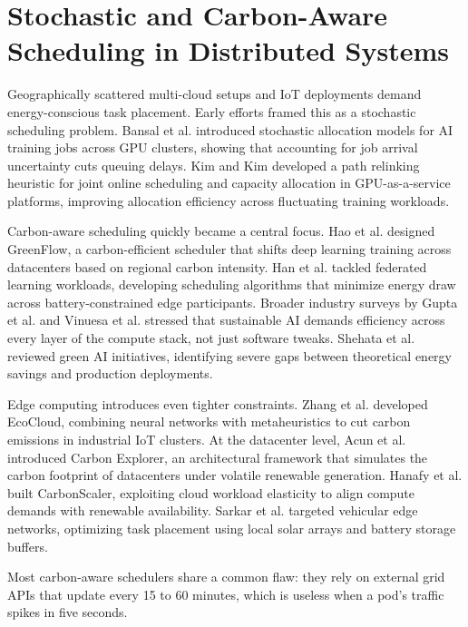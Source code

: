 \documentclass[12pt]{report}
\begin{document}
\section{Stochastic and Carbon-Aware Scheduling in Distributed Systems}

Geographically scattered multi-cloud setups and IoT deployments demand energy-conscious task placement. Early efforts framed this as a stochastic scheduling problem. Bansal et al. \cite{bansal2023} introduced stochastic allocation models for AI training jobs across GPU clusters, showing that accounting for job arrival uncertainty cuts queuing delays. Kim and Kim \cite{kim2023} developed a path relinking heuristic for joint online scheduling and capacity allocation in GPU-as-a-service platforms, improving allocation efficiency across fluctuating training workloads. 

Carbon-aware scheduling quickly became a central focus. Hao et al. \cite{hao2023} designed GreenFlow, a carbon-efficient scheduler that shifts deep learning training across datacenters based on regional carbon intensity. Han et al. \cite{han2023} tackled federated learning workloads, developing scheduling algorithms that minimize energy draw across battery-constrained edge participants. Broader industry surveys by Gupta et al. \cite{gupta2022} and Vinuesa et al. \cite{vinuesa2022} stressed that sustainable AI demands efficiency across every layer of the compute stack, not just software tweaks. Shehata et al. \cite{shehata2023} reviewed green AI initiatives, identifying severe gaps between theoretical energy savings and production deployments. 

Edge computing introduces even tighter constraints. Zhang et al. \cite{zhang2023} developed EcoCloud, combining neural networks with metaheuristics to cut carbon emissions in industrial IoT clusters. At the datacenter level, Acun et al. \cite{acun2022} introduced Carbon Explorer, an architectural framework that simulates the carbon footprint of datacenters under volatile renewable generation. Hanafy et al. \cite{hanafy2023} built CarbonScaler, exploiting cloud workload elasticity to align compute demands with renewable availability. Sarkar et al. \cite{sarkar2024} targeted vehicular edge networks, optimizing task placement using local solar arrays and battery storage buffers.

Most carbon-aware schedulers share a common flaw: they rely on external grid APIs that update every 15 to 60 minutes, which is useless when a pod's traffic spikes in five seconds.
\end{document}
